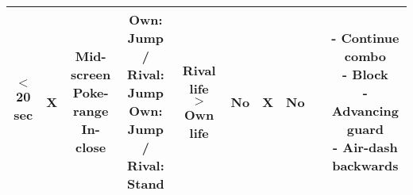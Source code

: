 \documentclass{article}
\begin{document}
\begin{landscape}
\begin{table}[h!]
\begin{center}
\begin{tabular*}{27cm}{c|c|c|c|c|c|c|c|c|c}
      \hline
      $<$ 20 sec & X & \makecell{Mid-screen \\ Poke-range\\ In-close} & \makecell{Own: Jump / Rival: Jump \\ Own: Jump / Rival: Stand} & Rival life $>$ Own life & No & X & No & & \makecell{- Continue combo \\ - Block \\ - Advancing guard \\ - Air-dash backwards}\\
      \hline
    \end{tabular*}
  \end{center}
\end{table}

\end{landscape}

\newpage 
\end{document}
